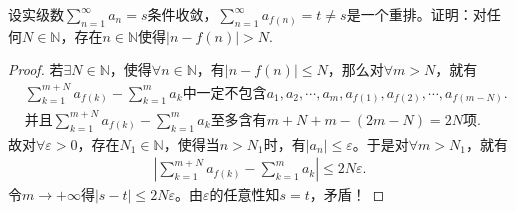 \documentclass[../../main.tex]{subfiles}
\begin{document}
\begin{example}
设实级数$\sum_{n=1}^{\infty} a_n = s$条件收敛，$\sum_{n=1}^{\infty} a_{f(n)} = t \neq s$是一个重排。证明：对任何$N \in \mathbb{N}$，存在$n \in \mathbb{N}$使得$|n - f(n)| > N$.
\end{example}
\begin{proof}
若$\exists N\in \mathbb{N}$，使得$\forall n\in \mathbb{N}$，有$\left| n-f\left( n \right) \right|\leqslant N$，那么对$\forall m>N$，就有
\begin{align*}
&\sum_{k=1}^{m+N}{a_{f\left( k \right)}}-\sum_{k=1}^m{a_k}\text{中一定不包含}a_1,a_2,\cdots ,a_m,a_{f\left( 1 \right)},a_{f\left( 2 \right)},\cdots ,a_{f\left( m-N \right)}.
\\
&\text{并且}\sum_{k=1}^{m+N}{a_{f\left( k \right)}}-\sum_{k=1}^m{a_k}\text{至多含有}m+N+m-\left( 2m-N \right) =2N\text{项}.
\end{align*}
故对$\forall \varepsilon >0$，存在$N_1\in \mathbb{N}$，使得当$n>N_1$时，有$\left| a_n \right|\leqslant \varepsilon$。于是对$\forall m>N_1$，就有
\begin{align*}
\left| \sum_{k=1}^{m+N}{a_{f\left( k \right)}}-\sum_{k=1}^m{a_k} \right|\leqslant 2N\varepsilon.
\end{align*}
令$m\rightarrow +\infty$得$\left| s-t \right|\leqslant 2N\varepsilon$。由$\varepsilon$的任意性知$s=t$，矛盾！

\end{proof}
\end{document}
